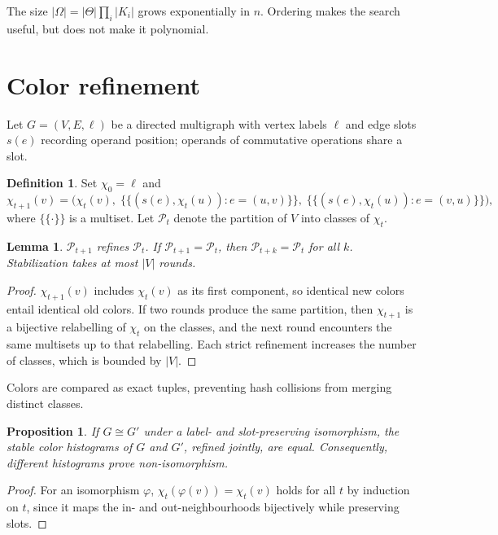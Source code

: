 \documentclass[11pt]{article}
\newtheorem{proposition}[theorem]{Proposition}
\newtheorem{lemma}[theorem]{Lemma}
\theoremstyle{definition}
\newtheorem{definition}[theorem]{Definition}
\theoremstyle{remark}
\begin{document}
The size $|\Omega| = |\Theta| \prod_i |K_i|$ grows exponentially in $n$. Ordering makes the search useful, but does not make it polynomial.

\section{Color refinement}

Let $G = (V, E, \ell)$ be a directed multigraph with vertex labels $\ell$ and edge slots $s(e)$ recording operand position; operands of commutative operations share a slot.

\begin{definition}
Set $\chi_0 = \ell$ and
\[
  \chi_{t+1}(v) = \Big( \chi_t(v),\; \big\{\!\big\{ (s(e), \chi_t(u)) : e = (u,v) \big\}\!\big\},\; \big\{\!\big\{ (s(e), \chi_t(u)) : e = (v,u) \big\}\!\big\} \Big),
\]
where $\{\!\{\cdot\}\!\}$ is a multiset. Let $\mathcal{P}_t$ denote the partition of $V$ into classes of $\chi_t$.
\end{definition}

\begin{lemma}
$\mathcal{P}_{t+1}$ refines $\mathcal{P}_t$. If $\mathcal{P}_{t+1} = \mathcal{P}_t$, then $\mathcal{P}_{t+k} = \mathcal{P}_t$ for all $k$. Stabilization takes at most $|V|$ rounds.
\end{lemma}

\begin{proof}
$\chi_{t+1}(v)$ includes $\chi_t(v)$ as its first component, so identical new colors entail identical old colors. If two rounds produce the same partition, then $\chi_{t+1}$ is a bijective relabelling of $\chi_t$ on the classes, and the next round encounters the same multisets up to that relabelling. Each strict refinement increases the number of classes, which is bounded by $|V|$.
\end{proof}

Colors are compared as exact tuples, preventing hash collisions from merging distinct classes.

\begin{proposition}
If $G \cong G'$ under a label- and slot-preserving isomorphism, the stable color histograms of $G$ and $G'$, refined jointly, are equal. Consequently, different histograms prove non-isomorphism.
\end{proposition}

\begin{proof}
For an isomorphism $\varphi$, $\chi_t(\varphi(v)) = \chi_t(v)$ holds for all $t$ by induction on $t$, since it maps the in- and out-neighbourhoods bijectively while preserving slots.
\end{proof}
\end{document}
